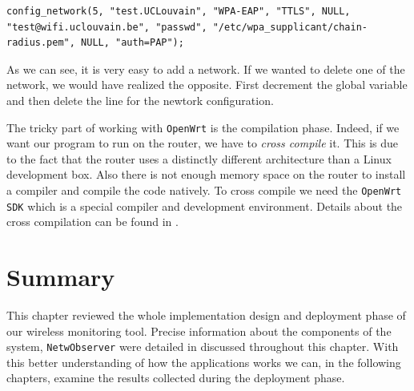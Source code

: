 \begin{lstlisting}[frame=single,breaklines=true,caption={Small log file example}]
config_network(5, "test.UCLouvain", "WPA-EAP", "TTLS", NULL, "test@wifi.uclouvain.be", "passwd", "/etc/wpa_supplicant/chain-radius.pem", NULL, "auth=PAP");
\end{lstlisting}

As we can see, it is very easy to add a network. If we wanted to delete one of the network, we would have realized the opposite. First decrement the global variable and then delete the line for the newtork configuration. 

The tricky part of working with \texttt{OpenWrt} is the compilation phase. Indeed, if we want our program to run on the router, we have to \textit{cross compile} it. This is due to the fact that the router uses a distinctly different architecture than a Linux development box. Also there is not enough memory space on the router to install a compiler and compile the code natively. To cross compile we need the \texttt{OpenWrt SDK} which is a special compiler and development environment. Details about the cross compilation can be found in \cite{crosscompile}.



\section{Summary}
This chapter reviewed the whole implementation design and deployment phase of our wireless monitoring tool. Precise information about the components of the system, \texttt{NetwObserver} were detailed in discussed throughout this chapter. With this better understanding of how the applications works we can, in the following chapters, examine the results collected during the deployment phase. 
